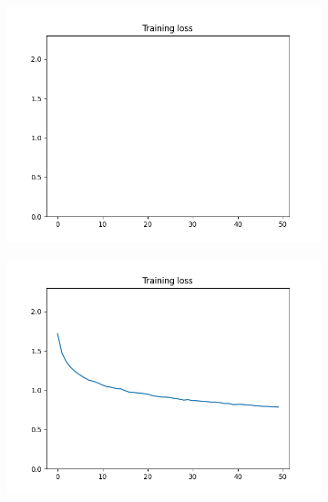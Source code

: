 \documentclass[12pt]{article}
\begin{document}
\begin{figure}
  \begin{subfigure}{0.19\textwidth}
    \centering
    \includegraphics[width=\linewidth]{loss_3_lr1e2.png}
    \caption{}
    \label{fig:3_lr1e2}
  \end{subfigure}
  \begin{subfigure}{0.19\textwidth}
    \centering
    \includegraphics[width=\linewidth]{loss_3_lr1e-1.png}
    \caption{}
    \label{fig:3_lr1e-1}
  \end{subfigure}
  \begin{subfigure}{0.19\textwidth}
    \centering

\end{subfigure}
\end{figure}
\end{document}
